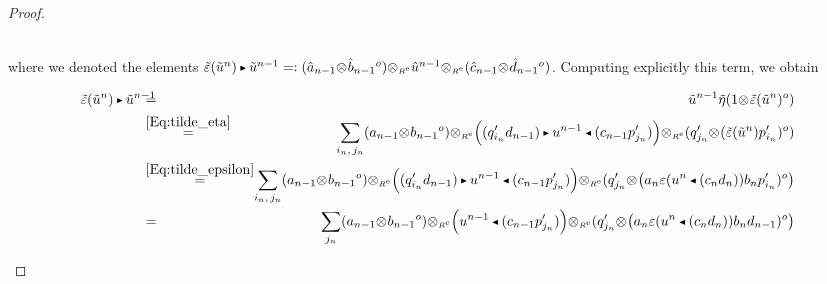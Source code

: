 \documentclass[reqno, a4paper, 10pt]{amsart}
\numberwithin{equation}{section}
\theoremstyle{plain}
\theoremstyle{definition}
\theoremstyle{remark}
\begin{document}
\begin{proof}
\begin{footnotesize}
\begin{eqnarray*}
\end{eqnarray*}
\end{footnotesize}
where we denoted the elements ${\tilde{{\varepsilon}}}({\tilde{{u}}}^n){{\,\raise1pt\hbox{$\scriptscriptstyle{\blacktriangleright}$} \, }} {\tilde{{u}}}^{n-1} =: 
(\hat{a}_{n-1}{\otimes_{\scriptscriptstyle{{}}}}\hat{b}_{n-1}{}^o){\otimes_{\scriptscriptstyle{{\scriptscriptstyle{{R^{\rm e}}}}}}}\hat{u}^{n-1}{\otimes_{\scriptscriptstyle{{\scriptscriptstyle{{R^{\rm e}}}}}}}(\hat{c}_{n-1}{\otimes_{\scriptscriptstyle{{}}}}\hat{d}_{n-1}{}^o)$. 
Computing explicitly this term, we obtain
\begin{footnotesize}
\begin{eqnarray*}
{\tilde{{\varepsilon}}}({\tilde{{u}}}^n){{\,\raise1pt\hbox{$\scriptscriptstyle{\blacktriangleright}$} \, }} {\tilde{{u}}}^{n-1}&\!\!\!\!\!\!
=&\!\!\!\!\!\! {\tilde{{u}}}^{n-1}{\tilde{{\eta}}}(1{\otimes_{\scriptscriptstyle{{}}}}{\tilde{{\varepsilon}}}({\tilde{{u}}}^n)^o) \nonumber \\
&\!\!\!\!\!\!\overset{\eqref{Eq:tilde_eta} }{=}&\!\!\!\!\!\! \sum_{i_n,\, j_n} 
({a}_{n-1}{\otimes_{\scriptscriptstyle{{}}}}{b}_{n-1}{}^o){\otimes_{\scriptscriptstyle{{\scriptscriptstyle{{R^{\rm e}}}}}}}\Big ((q_{i_n}'d_{n-1}){{\,\raise1pt\hbox{$\scriptscriptstyle{\blacktriangleright}$} \, }}{u}^{n-1} {{\,\raise1pt\hbox{$\scriptscriptstyle{\blacktriangleleft}$} \, }} (c_{n-1}p_{j_n}') \Big) {\otimes_{\scriptscriptstyle{{\scriptscriptstyle{{R^{\rm e}}}}}}}(q_{j_n}'{\otimes_{\scriptscriptstyle{{}}}}({\tilde{{\varepsilon}}}({\tilde{{u}}}^n) p_{i_n}'){}^o) \nonumber \\
&\!\!\!\!\!\!\overset{\eqref{Eq:tilde_epsilon}}{=}&\!\!\!\!\!\!
\sum_{i_n,\, j_n} 
({a}_{n-1}{\otimes_{\scriptscriptstyle{{}}}}{b}_{n-1}{}^o){\otimes_{\scriptscriptstyle{{\scriptscriptstyle{{R^{\rm e}}}}}}}\Big ((q_{i_n}'d_{n-1}){{\,\raise1pt\hbox{$\scriptscriptstyle{\blacktriangleright}$} \, }}{u}^{n-1} {{\,\raise1pt\hbox{$\scriptscriptstyle{\blacktriangleleft}$} \, }} (c_{n-1}p_{j_n}') \Big)  {\otimes_{\scriptscriptstyle{{\scriptscriptstyle{{R^{\rm e}}}}}}}(q_{j_n}'{\otimes_{\scriptscriptstyle{{}}}}{\big( {a_n \varepsilon(u^n{{\,\raise1pt\hbox{$\scriptscriptstyle{\blacktriangleleft}$} \, }} (c_nd_n)) b_n p_{i_n}'){}^o} \big)}  \nonumber\\ 
&\!\!\!\!\!\!=&\!\!\!\!\!\! 
\sum_{ j_n} 
({a}_{n-1}{\otimes_{\scriptscriptstyle{{}}}}{b}_{n-1}{}^o){\otimes_{\scriptscriptstyle{{\scriptscriptstyle{{R^{\rm e}}}}}}}\Big ({u}^{n-1} {{\,\raise1pt\hbox{$\scriptscriptstyle{\blacktriangleleft}$} \, }} (c_{n-1}p_{j_n}') \Big)  {\otimes_{\scriptscriptstyle{{\scriptscriptstyle{{R^{\rm e}}}}}}}(q_{j_n}'{\otimes_{\scriptscriptstyle{{}}}}{\big( {a_n \varepsilon(u^n{{\,\raise1pt\hbox{$\scriptscriptstyle{\blacktriangleleft}$} \, }} (c_nd_n)) b_n d_{n-1}){}^o} \big)}

\end{eqnarray*}
\end{footnotesize}
\end{proof}
\end{document}
